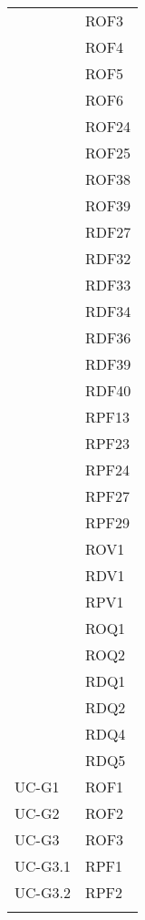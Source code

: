 \begin{longtable}{| p{5cm} | p{5cm} |}
		\rowcolor{LightGray}
		\multirow[t]{23}{*}{\cellcolor{LightGray}}{Capitolato} 
				 & ROF3 \\
				\rowcolor{LightGray} &	ROF4 \\
				\rowcolor{LightGray} &	ROF5 \\
				\rowcolor{LightGray} &	ROF6 \\
				\rowcolor{LightGray} &	ROF24 \\
				\rowcolor{LightGray} &	ROF25 \\
				\rowcolor{LightGray} &	ROF38 \\
				\rowcolor{LightGray} &	ROF39 \\
				\rowcolor{LightGray} &	RDF27 \\
				\rowcolor{LightGray} &	RDF32 \\
				\rowcolor{LightGray} &	RDF33 \\
				\rowcolor{LightGray} &	RDF34 \\
				\rowcolor{LightGray} &	RDF36 \\
				\rowcolor{LightGray} &	RDF39 \\
				\rowcolor{LightGray} &	RDF40 \\
				\rowcolor{LightGray} &	RPF13 \\
				\rowcolor{LightGray} &	RPF23 \\
				\rowcolor{LightGray} &	RPF24 \\
				\rowcolor{LightGray} &	RPF27 \\
				\rowcolor{LightGray} &	RPF29 \\
				\rowcolor{LightGray} &	ROV1 \\
				\rowcolor{LightGray} &	RDV1 \\
				\rowcolor{LightGray} &	RPV1 \\
				\rowcolor{LightGray} &	ROQ1 \\
				\rowcolor{LightGray} &	ROQ2 \\
				\rowcolor{LightGray} &	RDQ1 \\
				\rowcolor{LightGray} &	RDQ2 \\
				\rowcolor{LightGray} &	RDQ4 \\
				\rowcolor{LightGray} &	RDQ5 \\
		UC-G1 & ROF1\\
		\rowcolor{LightGray}
		UC-G2 & ROF2\\
		UC-G3 & ROF3 \\
		\rowcolor{LightGray}
		UC-G3.1 & RPF1 \\
		UC-G3.2 & RPF2 \\
		\rowcolor{LightGray}

\end{longtable}
